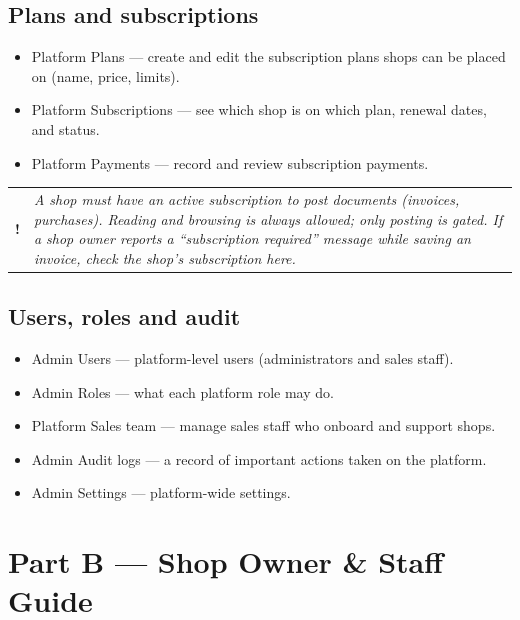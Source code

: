 \documentclass[11pt,a4paper]{article}
\makeatletter
\newcommand{\menu}[1]{\textsf{#1}}
\newenvironment{note}
  {\par\medskip\noindent\begin{tabular}{@{}p{0.03\textwidth}p{0.9\textwidth}@{}}
   \textbf{!} & \itshape}
  {\end{tabular}\par\medskip}
\makeatother
\begin{document}
\subsection{Plans and subscriptions}\label{sec:plans}
\begin{itemize}
  \item \menu{Platform \textrightarrow{} Plans} --- create and edit the
        subscription plans shops can be placed on (name, price, limits).
  \item \menu{Platform \textrightarrow{} Subscriptions} --- see which shop is on
        which plan, renewal dates, and status.
  \item \menu{Platform \textrightarrow{} Payments} --- record and review
        subscription payments.
\end{itemize}

\begin{note}
A shop must have an active subscription to \emph{post} documents (invoices,
purchases). Reading and browsing is always allowed; only posting is gated. If a
shop owner reports a ``subscription required'' message while saving an invoice,
check the shop's subscription here.
\end{note}

\subsection{Users, roles and audit}
\begin{itemize}
  \item \menu{Admin \textrightarrow{} Users} --- platform-level users
        (administrators and sales staff).
  \item \menu{Admin \textrightarrow{} Roles} --- what each platform role may do.
  \item \menu{Platform \textrightarrow{} Sales team} --- manage sales staff who
        onboard and support shops.
  \item \menu{Admin \textrightarrow{} Audit logs} --- a record of important
        actions taken on the platform.
  \item \menu{Admin \textrightarrow{} Settings} --- platform-wide settings.
\end{itemize}

\clearpage
\section{Part B --- Shop Owner \& Staff Guide}
\end{document}
